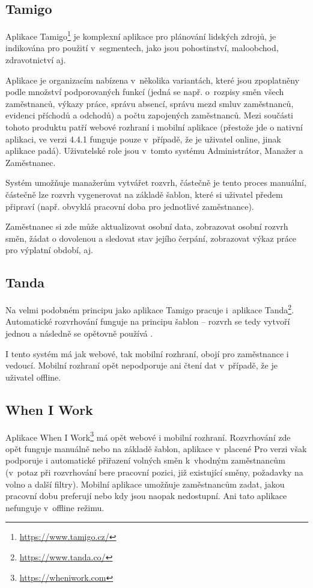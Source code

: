 \documentclass[twoside]{ctuthesis}
\begin{document}
\subsection{Tamigo}
Aplikace Tamigo\footnote{\url{https://www.tamigo.cz/}} je komplexní aplikace pro plánování lidských zdrojů, je indikována pro použití v~segmentech, jako jsou pohostinství, maloobchod, zdravotnictví aj. \cite{tamigo2020reseni}

Aplikace je organizacím nabízena v~několika variantách, které jsou zpop\-lat\-ně\-ny podle množství podporovaných funkcí (jedná se např. o~rozpisy směn všech zaměstnanců, výkazy práce, správu absencí, správu mezd smluv zaměstnanců, evidenci příchodů a odchodů) a počtu zapojených zaměstnanců. Mezi součásti tohoto produktu patří webové rozhraní i mobilní aplikace (přestože jde o nativní aplikaci, ve verzi 4.4.1 funguje pouze v~případě, že je uživatel online, jinak aplikace padá). Uživatelské role jsou v~tomto systému Administrátor, Manažer a Zaměstnanec.

Systém umožňuje manažerům vytvářet rozvrh, částečně je tento proces manuální, částečně lze rozvrh vygenerovat na základě šablon, které si uživatel předem připraví (např. obvyklá pracovní doba pro jednotlivé zaměstnance). %

Za\-měst\-na\-nec si zde může aktualizovat osobní data, zobrazovat osobní rozvrh směn, žádat o dovolenou a sledovat stav jejího čerpání, zobrazovat výkaz práce pro výplatní období, aj.

\subsection{Tanda}
Na velmi podobném principu jako aplikace Tamigo pracuje i~aplikace Tanda\footnote{\url{https://www.tanda.co/}}. Automatické rozvrhování funguje na principu šablon -- rozvrh se tedy vytvoří jednou a následně se opětovně používá \cite{tanda2020rosters}.

I tento systém má jak webové, tak mobilní rozhraní, obojí pro zaměstnance i vedoucí. Mobilní rozhraní opět nepodporuje ani čtení dat v~případě, že je uživatel offline.

\subsection{When I Work}
Aplikace When I Work\footnote{\url{https://wheniwork.com}} má opět webové i mobilní rozhraní. Rozvrhování zde opět funguje manuálně nebo na základě šablon, aplikace v~placené Pro verzi \cite{wheinwork2020pricing} však podporuje i automatické přiřazení volných směn k~vhodným zaměstnancům (v~potaz při rozvrhování bere pracovní pozici, již existující směny, požadavky na volno a další filtry). \cite{wheinwork2020employee} Mobilní aplikace umožňuje zaměstnancům zadat, jakou pracovní dobu preferují nebo kdy jsou naopak nedostupní. Ani tato aplikace nefunguje v~offline režimu.
\end{document}
